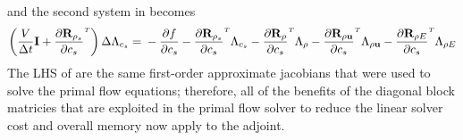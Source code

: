 and the second system in  becomes
\begin{equation}
  \left( \frac{V}{\Delta t} \mi + \rtdiff{\rho_s}{c_s} \right) \Delta
  \adjlam{c_s}
  = \\ -\pd{f}{c_s}
  - \rtdiff{\rho_s}{c_s} \adjlam{c_s}
  - \rtdiff{\rho}{c_s} \adjlam{\rho}
  - \rtdiff{\rho \vu}{c_s} \adjlam{\rho \vu}
  - \rtdiff{\rho E}{c_s} \adjlam{\rho E}
  \label{adj-dc-time2}
\end{equation}
The LHS of  are the same first-order
approximate jacobians that were used to solve the primal flow equations;
therefore, all of the benefits of the diagonal block matricies that are
exploited in the primal flow solver to reduce the linear solver cost and overall
memory now apply to the adjoint.
